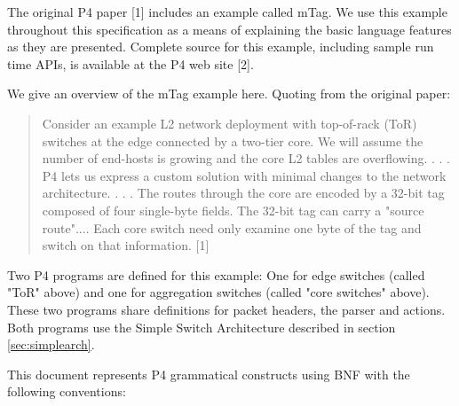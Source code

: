 \documentclass[12pt]{article}
\begin{document}

The original P4 paper [1] includes an example called mTag. We use this example 
throughout this specification as a means of explaining the basic language 
features as they are presented. Complete source for this example, including 
sample run time APIs, is available at the P4 web site [2].

We give an overview of the mTag example here.  Quoting from the original paper:

\begin{quote}
Consider an example L2 network deployment with top-of-rack (ToR) switches 
at the edge connected by a two-tier core. We will assume the number of end-hosts 
is growing and the core L2 tables are overflowing. . . .  P4 lets us express a 
custom solution with minimal changes to the network architecture. . . . The routes 
through the core are encoded by a 32-bit tag composed of four single-byte 
fields.  The 32-bit tag can carry a "source route".... Each core switch need 
only examine one byte of the tag and switch on that information. [1]
\end{quote}

Two P4 programs are defined for this example: One for edge switches (called 
"ToR" above) and one for aggregation switches (called "core switches" above). 
These two programs share definitions for packet headers, the parser and actions.
Both programs use the Simple Switch Architecture described in section
\ref{sec:simplearch}.


This document represents P4 grammatical constructs using BNF with the
following conventions:
\end{document}
